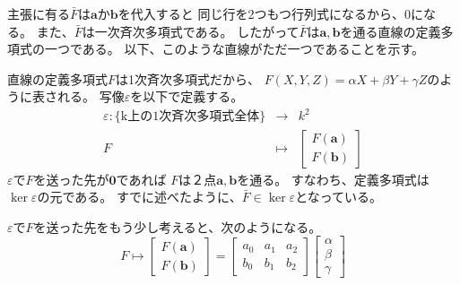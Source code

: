 \documentclass[a4]{article}
\begin{document}
        \begin{Proof}
            主張に有る$\bar{F}$は$\mathbf{a}$か$\mathbf{b}$を代入すると
            同じ行を2つもつ行列式になるから、0になる。
            また、$\bar{F}$は一次斉次多項式である。
            したがって$\bar{F}$は$\mathbf{a}, \mathbf{b}$を通る直線の定義多項式の一つである。
            以下、このような直線がただ一つであることを示す。

            直線の定義多項式$F$は1次斉次多項式だから、
            $F(X, Y, Z)=\alpha X + \beta Y + \gamma Z$のように表される。
            写像$\varepsilon$を以下で定義する。
            \begin{eqnarray*}
                \varepsilon : \{ \mbox{k上の1次斉次多項式全体} \} &\to& k^2 \\
                F &\mapsto& 
                        \left[
                          \begin{array}{c}
                              F(\mathbf{a})\\
                              F(\mathbf{b})
                          \end{array}
                        \right]
            \end{eqnarray*}
            $\varepsilon$で$F$を送った先が$\mathbf{0}$であれば
            $F$は２点$\mathbf{a}, \mathbf{b}$を通る。
            すなわち、定義多項式は$\ker \varepsilon$の元である。
            すでに述べたように、$\bar{F} \in \ker \varepsilon$となっている。

            $\varepsilon$で$F$を送った先をもう少し考えると、次のようになる。
            \[
                F \mapsto 
                        \left[
                          \begin{array}{c}
                              F(\mathbf{a}) \\
                              F(\mathbf{b})
                          \end{array}
                        \right]
                        =
                        \left[
                          \begin{array}{ccc}
                              a_0 & a_1 & a_2 \\
                              b_0 & b_1 & b_2
                          \end{array}
                        \right]
                        \left[
                          \begin{array}{c}
                              \alpha \\ \beta \\ \gamma
                          \end{array}
                        \right]
            \]
            

\end{Proof}
\end{document}
